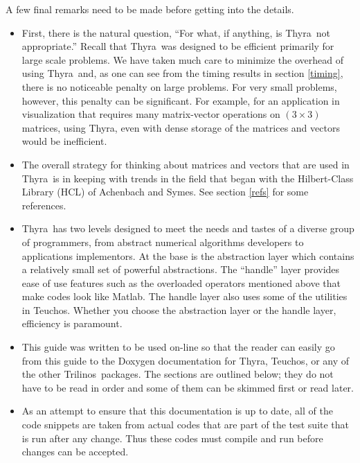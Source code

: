 \documentclass[12pt]{article}
\newcommand{\thyra}{{\sf Thyra}}
\newcommand{\tri}{{\sf Trilinos}}
\newcommand{\teuchos}{{\sf Teuchos}}
\newcommand{\matlab}{{\sf Matlab}}
\begin{document}
 
A few final remarks need to be made before getting into the details.
\begin{itemize}
    \item First, there is the natural question, ``For what, if
  anything, is \thyra\ not appropriate.''  Recall that \thyra\ was
  designed to be efficient primarily for large scale problems. We have
  taken much care to minimize the overhead of using \thyra\ and, as one
  can see from the timing results in section \ref{timing}, there is no
  noticeable penalty on large problems.  For very small problems,
  however, this penalty can be significant.  For example, for an
  application in visualization that requires many matrix-vector
  operations on $(3 \times 3)$ matrices, using \thyra, even with dense
  storage of the matrices and vectors would be inefficient.
    \item The overall strategy for thinking about matrices and vectors
  that are used in \thyra\ is in keeping with trends in the field that
  began with the Hilbert-Class Library (HCL) of Achenbach and Symes.
  See section \ref{refs} for some references.
    \item \thyra\ has two levels designed to meet the needs and tastes
  of a diverse group of programmers, from abstract numerical
  algorithms developers to applications implementors.  At the base is
  the abstraction layer which contains a relatively small set of powerful
  abstractions.  The ``handle'' layer provides ease of use features such
  as the overloaded operators mentioned above that make codes look like
  \matlab.  The handle layer also uses some of the utilities in
  \teuchos.  Whether you choose the abstraction layer or the
  handle layer, efficiency is paramount.
    \item This guide was written to be used on-line so that the reader
  can easily go from this guide to the Doxygen documentation for
  \thyra, \teuchos, or any of the other \tri\ packages.  The sections
  are outlined below; they do not have to be read in order and some of
  them can be skimmed first or read later.
    \item As an attempt to ensure that this documentation is up to
  date, all of the code snippets are taken from actual codes that are
  part of the test suite that is run after any change.  Thus these
  codes must compile and run before changes can be accepted.
\end{itemize}
\end{document}
